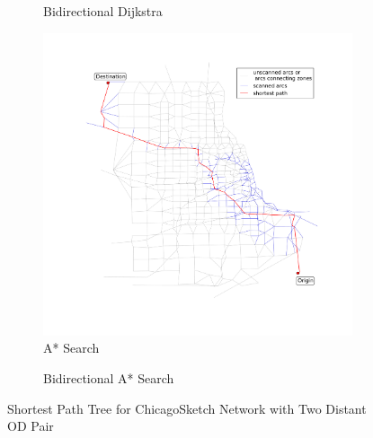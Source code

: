 \begin{figure}
\begin{subfigure}{.5\textwidth}
        \caption{Bidirectional Dijkstra}
        \label{fig:chicago_bidirect}
    \end{subfigure}
    \begin{subfigure}{.5\textwidth}
        \centering
        \includegraphics[width=\textwidth,trim=120px 120px 48px 0px,clip]{img/chicago_astar}
        \caption{A* Search}
        \label{fig:chicago_Astar_bidirect}
    \end{subfigure}%
    \begin{subfigure}{.5\textwidth}
        \centering
        \caption{Bidirectional A* Search}
        \label{fig:chicago_astar_bidirect}
    \end{subfigure}
    \vspace{1em}
    \caption{Shortest Path Tree for ChicagoSketch Network with Two Distant OD Pair}
    \label{fig:long_sptree}
\end{figure}


